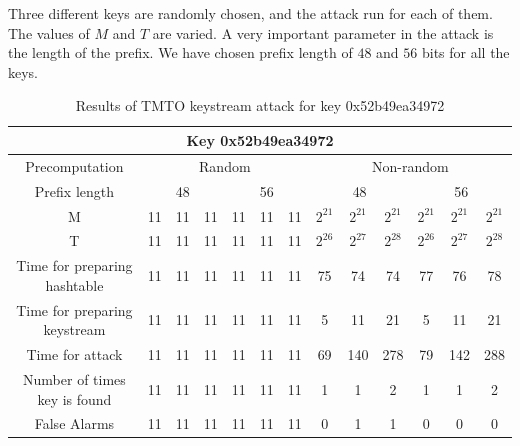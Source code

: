 Three different keys are randomly chosen, and the attack run for each of them. The values of $M$ and $T$ are varied. A very important parameter in the attack is the length of the prefix. We have chosen prefix length of $48$ and $56$ bits for all the keys. 

\begin{table}[ht!]
\begin{center}
\begin{tabular}{|c||@{}c@{}|@{}c@{}|@{}c@{}|@{}c@{}|@{}c@{}|@{}c@{}|@{}c@{}|@{}c@{}|@{}c@{}|@{}c@{}|@{}c@{}|@{}c@{}|}
\hline
\multicolumn{13}{|c|}{\textbf{Key 0x52b49ea34972}} \\ \hline
Precomputation & \multicolumn{6}{|c|}{Random} & \multicolumn{6}{|c|}{Non-random} \\ \hline
Prefix length& \multicolumn{3}{|c|}{48} & \multicolumn{3}{|c|}{56} & \multicolumn{3}{|c|}{48} & \multicolumn{3}{|c|}{56} \\ \hline \hline

M																&	11 &	11 &	11 &	11 &	11 &	11 &	$2^{21}$ & $2^{21}$ &	$2^{21}$ & $2^{21}$ & $2^{21}$ &	$2^{21}$ \\ \hline
T	  														&	11 &	11 &	11 &	11 &	11 &	11 &	$2^{26}$ & $2^{27}$ &	$2^{28}$ & $2^{26}$ & $2^{27}$ &	$2^{28}$ \\ \hline
Time for preparing hashtable		&	11 &	11 &	11 &	11 &	11 &	11 &	75 & 74 &	74 &	77 &	76 &	78 \\ \hline
Time for preparing keystream		&	11 &	11 &	11 &	11 &	11 &	11 &	5 & 11 &	21 &	5 &	11 &	21 \\ \hline
Time for attack									&	11 &	11 &	11 &	11 &	11 &	11 &	69 & 140 &	278 &	79 &	142 &	288 \\ \hline
Number of times key is found		&	11 &	11 &	11 &	11 &	11 &	11 &	1 & 1 &	2 &	1 &	1 &	2 \\ \hline
False Alarms										&	11 &	11 &	11 &	11 &	11 &	11 &	0 & 1 &	1 &	0 &	0 &	0 \\ \hline
\end{tabular}
\end{center}
\caption{Results of TMTO keystream attack for key 0x52b49ea34972}
\label{tab:keystream-attack-results}
\end{table}

